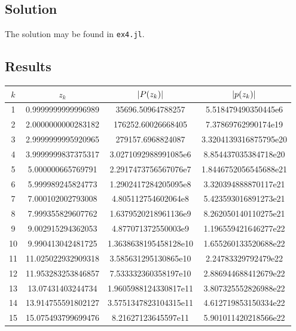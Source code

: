 \documentclass[a4paper, 12pt]{article}
\newcommand{\code}[1]{\texttt{#1}}
\DeclarePairedDelimiter\abs{\lvert}{\rvert}
\begin{document}
\subsection{Solution}
The solution may be found in \code{ex4.jl}.

\subsection{Results}

\begin{table}[H]
\centering
\begin{tabular}{@{}cccc@{}}
\toprule
$k$ & $z_k$              & $\abs{P(z_k)}$        & $\abs{p(z_k)}$ \\ \midrule
1   & 0.9999999999996989 & 35696.50964788257     & 5.518479490350445e6 \\ \midrule
2   & 2.0000000000283182 & 176252.60026668405    & 7.37869762990174e19 \\ \midrule
3   & 2.9999999995920965 & 279157.6968824087     & 3.3204139316875795e20 \\ \midrule
4   & 3.9999999837375317 & 3.0271092988991085e6  & 8.854437035384718e20 \\ \midrule
5   & 5.000000665769791  & 2.2917473756567076e7  & 1.8446752056545688e21 \\ \midrule
6   & 5.999989245824773  & 1.2902417284205095e8  & 3.320394888870117e21 \\ \midrule
7   & 7.000102002793008  & 4.805112754602064e8   & 5.423593016891273e21 \\ \midrule
8   & 7.999355829607762  & 1.6379520218961136e9  & 8.262050140110275e21 \\ \midrule
9   & 9.002915294362053  & 4.877071372550003e9   & 1.196559421646277e22 \\ \midrule
10  & 9.990413042481725  & 1.3638638195458128e10 & 1.655260133520688e22 \\ \midrule
11  & 11.025022932909318 & 3.585631295130865e10  & 2.24783329792479e22 \\ \midrule
12  & 11.953283253846857 & 7.533332360358197e10  & 2.886944688412679e22 \\ \midrule
13  & 13.07431403244734  & 1.9605988124330817e11 & 3.807325552826988e22 \\ \midrule
14  & 13.914755591802127 & 3.5751347823104315e11 & 4.612719853150334e22 \\ \midrule
15  & 15.075493799699476 & 8.21627123645597e11   & 5.901011420218566e22 \\ \midrule

\end{tabular}
\end{table}
\end{document}
